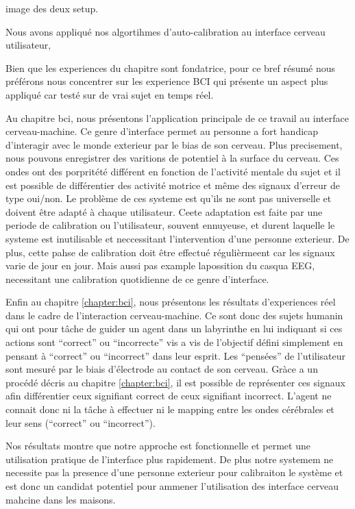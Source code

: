 image des deux setup.

Nous avons appliqué nos algortihmes d'auto-calibration au interface cerveau utilisateur,

Bien que les experiences du chapitre sont fondatrice, pour ce bref résumé nous préférons nous concentrer sur les experience BCI qui présente un aspect plus appliqué car testé sur de vrai sujet en temps réel.

Au chapitre bci, nous présentons l'application principale de ce travail au interface cerveau-machine. Ce genre d'interface permet au personne a fort handicap d'interagir avec le monde exterieur par le bias de son cerveau. Plus precisement, nous pouvons enregistrer des varitions de potentiel à la surface du cerveau. Ces ondes ont des porpritété différent en fonction de l'activité mentale du sujet et il est possible de différentier des activité motrice et même des signaux d'erreur de type oui/non. Le problème de ces systeme est qu'ils ne sont pas universelle et doivent être adapté à chaque utilisateur. Ceete adaptation est faite par une periode de calibration ou l'utilisateur, souvent ennuyeuse, et durent laquelle le systeme est inutilisable et neccessitant l'intervention d'une personne exterieur. De plus, cette pahse de calibration doit être effectué régulièrmeent car les signaux varie de jour en jour. Mais aussi pas example lapossition du casqua EEG, necessitant une calibration quotidienne de ce genre d'interface.

Enfin au chapitre \ref{chapter:bci}, nous présentons les résultats d'experiences réel dans le cadre de l'interaction cerveau-machine. Ce sont donc des sujets humanin qui ont pour tâche de guider un agent dans un labyrinthe en lui indiquant si ces actions sont ``correct''  ou ``incorrecte'' vis a vis de l'objectif défini simplement en pensant à ``correct'' ou ``incorrect'' dans leur esprit. Les ``pensées'' de l'utilisateur sont mesuré par le biais d'électrode au contact de son cerveau. Gràce a un procédé décris au chapitre \ref{chapter:bci}, il est possible de représenter ces signaux afin différentier ceux signifiant correct de ceux signifiant incorrect. L'agent ne connait donc ni la tâche à effectuer ni le mapping entre les ondes cérébrales et leur sens (``correct'' ou ``incorrect'').

Nos résultats montre que notre approche est fonctionnelle et permet une utilisation pratique de l'interface plus rapidement. De plus notre systemem ne necessite pas la presence d'une personne exterieur pour calibraiton le système et est donc un candidat potentiel pour ammener l'utilisation des interface cerveau mahcine dans les maisons.


